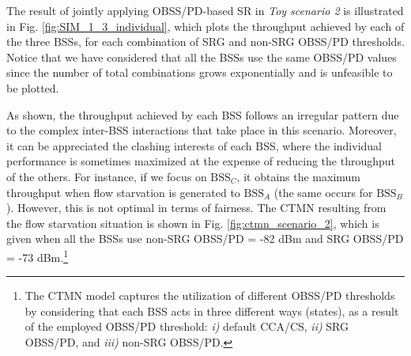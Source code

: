 \documentclass{ieeeaccess}
\begin{document}
The result of jointly applying OBSS/PD-based SR in \emph{Toy scenario 2} is illustrated in Fig. \ref{fig:SIM_1_3_individual}, which plots the throughput achieved by each of the three BSSs, for each combination of SRG and non-SRG OBSS/PD thresholds. Notice that we have considered that all the BSSs use the same OBSS/PD values since the number of total combinations grows exponentially and is unfeasible to be plotted.

As shown, the throughput achieved by each BSS follows an irregular pattern due to the complex inter-BSS interactions that take place in this scenario. Moreover, it can be appreciated the clashing interests of each BSS, where the individual performance is sometimes maximized at the expense of reducing the throughput of the others. For instance, if we focus on $\text{BSS}_C$, it obtains the maximum throughput when flow starvation is generated to $\text{BSS}_A$ (the same occurs for $\text{BSS}_B$). However, this is not optimal in terms of fairness. The CTMN resulting from the flow starvation situation is shown in Fig. \ref{fig:ctmn_scenario_2}, which is given when all the BSSs use non-SRG OBSS/PD = -82 dBm and SRG OBSS/PD = -73 dBm.\footnote{The CTMN model captures the utilization of different OBSS/PD thresholds by considering that each BSS acts in three different ways (states), as a result of the employed OBSS/PD threshold: \emph{i)} default CCA/CS, \emph{ii)} SRG OBSS/PD, and \emph{iii)} non-SRG OBSS/PD.}
\end{document}
